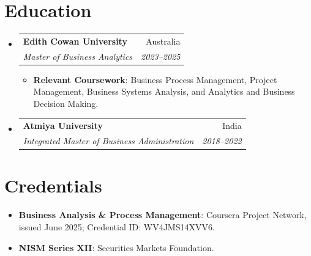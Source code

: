 \documentclass[letterpaper,9.5pt]{article}
\makeatletter
\newcommand{\resumeItem}[2]{
  \item\small{
    \textbf{#1}{: #2 \vspace{-2pt}}
  }
}
\newcommand{\resumeSubheading}[4]{
  \vspace{-1pt}\item
    \begin{tabular*}{0.97\textwidth}{l@{\extracolsep{\fill}}r}
      \textbf{#1} & #2 \\
      \textit{\small #3} & \textit{\small #4} \\
    \end{tabular*}\vspace{-5pt}
}
\newcommand{\resumeSubItem}[2]{\resumeItem{#1}{#2}\vspace{-4pt}}
\newcommand{\resumeSubHeadingListStart}{\begin{itemize}[leftmargin=*]}
\newcommand{\resumeSubHeadingListEnd}{\end{itemize}}
\newcommand{\resumeItemListStart}{\begin{itemize}}
\newcommand{\resumeItemListEnd}{\end{itemize}\vspace{-5pt}}
\makeatother
\begin{document}
\section{Education}
\resumeSubHeadingListStart
  \resumeSubheading
    {Edith Cowan University}{Australia}
    {Master of Business Analytics}{2023--2025}
    \resumeItemListStart
      \resumeItem{Relevant Coursework}
        {Business Process Management, Project Management, Business Systems Analysis, and Analytics and Business Decision Making.}
    \resumeItemListEnd
  \resumeSubheading
    {Atmiya University}{India}
    {Integrated Master of Business Administration}{2018--2022}
\resumeSubHeadingListEnd

\section{Credentials}
\resumeSubHeadingListStart
  \resumeSubItem{Business Analysis \& Process Management}
    {Coursera Project Network, issued June 2025; Credential ID: WV4JMS14XVV6.}
  \resumeSubItem{NISM Series XII}
    {Securities Markets Foundation.}
\resumeSubHeadingListEnd
\end{document}
